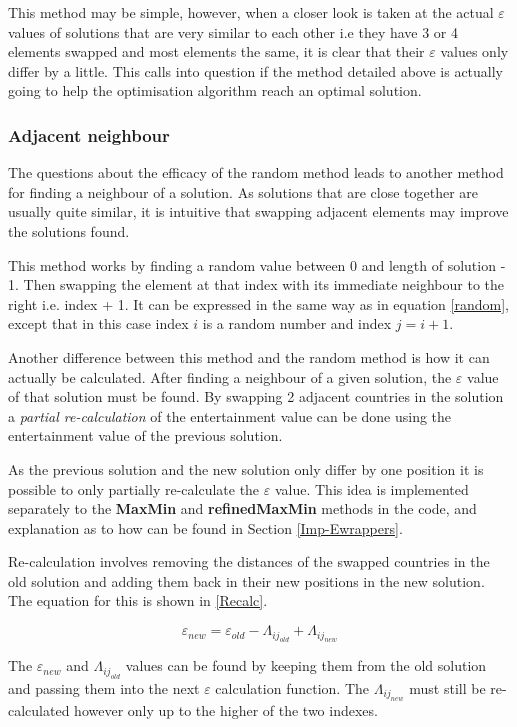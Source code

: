 \documentclass[12pt]{report}
\begin{document}
This method may be simple, however, when a closer look is taken at the actual $\varepsilon$ values of solutions that are very similar to each other i.e they have 3 or 4 elements swapped and most elements the same, it is clear that their $\varepsilon$ values only differ by a little. This calls into question if the method detailed above is actually going to help the optimisation algorithm reach an optimal solution.

\subsubsection{Adjacent neighbour}
The questions about the efficacy of the random method leads to another method for finding a neighbour of a solution. As solutions that are close together are usually quite similar, it is intuitive that swapping adjacent elements may improve the solutions found.

This method works by finding a random value between 0 and length of solution - 1. Then swapping the element at that index with its immediate neighbour to the right i.e. index + 1. It can be expressed in the same way as in equation \ref{random}, except that in this case index $i$ is a random number and index $j = i + 1$.

Another difference between this method and the random method is how it can actually be calculated. After finding a neighbour of a given solution, the $\varepsilon$ value of that solution must be found. By swapping 2 adjacent countries in the solution a \textit{partial re-calculation} of the entertainment value can be done using the entertainment value of the previous solution. 

As the previous solution and the new solution only differ by one position it is possible to only partially re-calculate the $\varepsilon$ value. This idea is implemented separately to the \textbf{MaxMin} and \textbf{refinedMaxMin} methods in the code, and explanation as to how can be found in Section \ref{Imp-Ewrappers}.

Re-calculation involves removing the distances of the swapped countries in the old solution and adding them back in their new positions in the new solution. The equation for this is shown in \ref{Recalc}.

\begin{equation}\label{Recalc}
	\varepsilon_{new} = \varepsilon_{old} - \Lambda_{ij_{old}} + \Lambda_{ij_{new}}
\end{equation}

The $\varepsilon_{new}$ and $\Lambda_{ij_{old}}$ values can be found by keeping them from the old solution and passing them into the next $\varepsilon$ calculation function. The $\Lambda_{ij_{new}}$ must still be re-calculated however only up to the higher of the two indexes.
\end{document}
